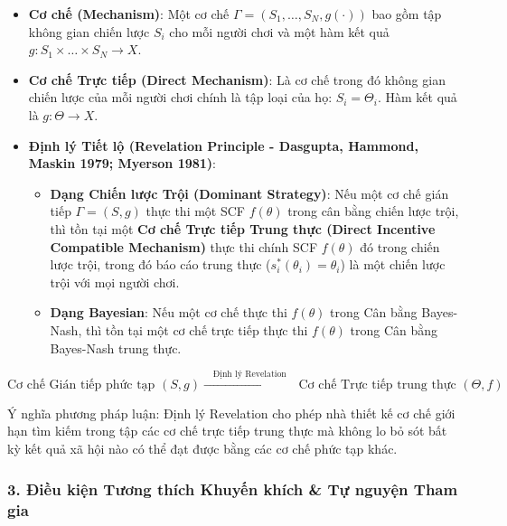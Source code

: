 \documentclass[
]{article}
\providecommand{\tightlist}{%
  \setlength{\itemsep}{0pt}\setlength{\parskip}{0pt}}
\begin{document}
\begin{itemize}
\item
  \textbf{Cơ chế (Mechanism)}: Một cơ chế
  \(\Gamma = (S_1, \dots, S_N, g(\cdot))\) bao gồm tập không gian chiến
  lược \(S_i\) cho mỗi người chơi và một hàm kết quả
  \(g: S_1 \times \dots \times S_N \to X\).
\item
  \textbf{Cơ chế Trực tiếp (Direct Mechanism)}: Là cơ chế trong đó không
  gian chiến lược của mỗi người chơi chính là tập loại của họ:
  \(S_i = \Theta_i\). Hàm kết quả là \(g: \Theta \to X\).
\item
  \textbf{Định lý Tiết lộ (Revelation Principle - Dasgupta, Hammond,
  Maskin 1979; Myerson 1981)}:

  \begin{itemize}
  \tightlist
  \item
    \textbf{Dạng Chiến lược Trội (Dominant Strategy)}: Nếu một cơ chế
    gián tiếp \(\Gamma = (S, g)\) thực thi một SCF \(f(\theta)\) trong
    cân bằng chiến lược trội, thì tồn tại một \textbf{Cơ chế Trực tiếp
    Trung thực (Direct Incentive Compatible Mechanism)} thực thi chính
    SCF \(f(\theta)\) đó trong chiến lược trội, trong đó báo cáo trung
    thực (\(s_i^*(\theta_i) = \theta_i\)) là một chiến lược trội với mọi
    người chơi.
  \item
    \textbf{Dạng Bayesian}: Nếu một cơ chế thực thi \(f(\theta)\) trong
    Cân bằng Bayes-Nash, thì tồn tại một cơ chế trực tiếp thực thi
    \(f(\theta)\) trong Cân bằng Bayes-Nash trung thực.
  \end{itemize}
\end{itemize}

\[\text{Cơ chế Gián tiếp phức tạp } (S, g) \xrightarrow{\quad \text{Định lý Revelation} \quad} \text{Cơ chế Trực tiếp trung thực } (\Theta, f)\]

Ý nghĩa phương pháp luận: Định lý Revelation cho phép nhà thiết kế cơ
chế giới hạn tìm kiếm trong tập các cơ chế trực tiếp trung thực mà không
lo bỏ sót bất kỳ kết quả xã hội nào có thể đạt được bằng các cơ chế phức
tạp khác.

\subsubsection{3. Điều kiện Tương thích Khuyến khích \& Tự nguyện Tham
gia}\label{ux111iux1ec1u-kiux1ec7n-tux1b0ux1a1ng-thuxedch-khuyux1ebfn-khuxedch-tux1ef1-nguyux1ec7n-tham-gia}
\end{document}
